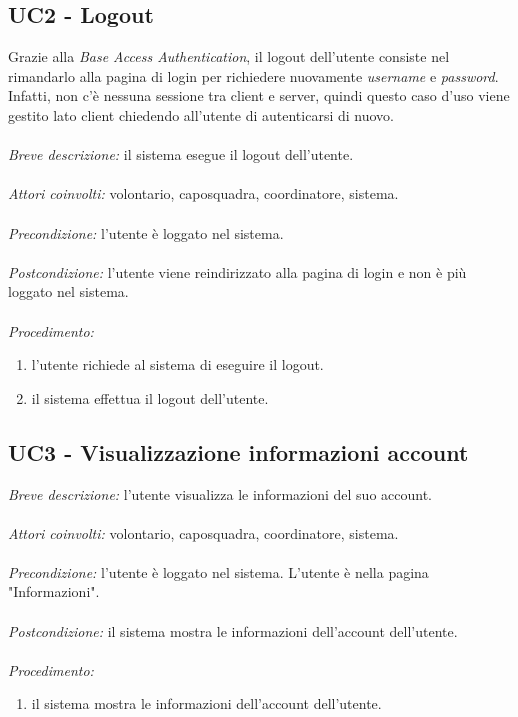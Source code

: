 \subsection{UC2 - Logout}
Grazie alla \textit{Base Access Authentication}, il logout dell'utente consiste nel rimandarlo alla pagina di login per richiedere nuovamente \textit{username} e \textit{password}. Infatti, non c'è nessuna sessione tra client e server, quindi questo caso d'uso viene gestito lato client chiedendo all'utente di autenticarsi di nuovo.
\\
\\ 
\textit{Breve descrizione:} il sistema esegue il logout dell'utente.
\\
\\
\textit{Attori coinvolti:} volontario, caposquadra, coordinatore, sistema.
\\
\\
\textit{Precondizione:} l'utente è loggato nel sistema.
\\
\\
\textit{Postcondizione:} l'utente viene reindirizzato alla pagina di login e non è più loggato nel sistema.
\\
\\
\textit{Procedimento:}
\begin{enumerate}
	\item l'utente richiede al sistema di eseguire il logout.
	\item il sistema effettua il logout dell'utente.
\end{enumerate}

\subsection{UC3 - Visualizzazione informazioni account}
\textit{Breve descrizione:} l'utente visualizza le informazioni del suo account.
\\
\\
\textit{Attori coinvolti:} volontario, caposquadra, coordinatore, sistema. 
\\
\\
\textit{Precondizione:} l'utente è loggato nel sistema. L'utente è nella pagina "Informazioni".
\\
\\
\textit{Postcondizione:} il sistema mostra le informazioni dell'account dell'utente.
\\
\\
\textit{Procedimento:}
\begin{enumerate}
	\item il sistema mostra le informazioni dell'account dell'utente.
\end{enumerate}


